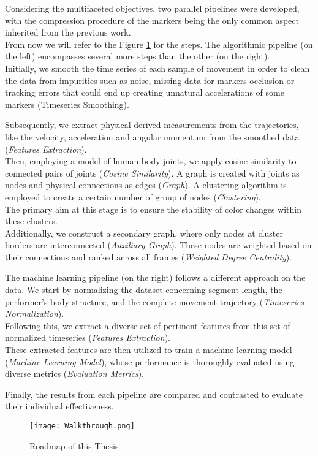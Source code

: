 Considering the multifaceted objectives, two parallel pipelines were developed, with the compression procedure of the markers being the only common aspect inherited from the previous work.
\\
From now we will refer to the Figure \ref{fig:walktrough} for the steps.
The algorithmic pipeline (on the left) encompasses several more steps than the other (on the right). 
\\
Initially, we smooth the time series of each sample of movement in order to clean the data from impurities such as noise, missing data for markers occlusion or tracking errors that could end up creating unnatural accelerations of some markers (Timeseries Smoothing).

Subsequently, we extract physical derived measurements from the trajectories, like the velocity, acceleration and angular momentum from the smoothed data (\textit{Features Extraction}). \\
Then, employing a model of human body joints, we apply cosine similarity to connected pairs of joints (\textit{Cosine Similarity}).
A graph is created with joints as nodes and physical connections as edges (\textit{Graph}). 
A clustering algorithm is employed to create a certain number of group of nodes (\textit{Clustering}). \\
The primary aim at this stage is to ensure the stability of color changes within these clusters. \\
Additionally, we construct a secondary graph, where only nodes at cluster borders are interconnected (\textit{Auxiliary Graph}).
These nodes are weighted based on their connections and ranked across all frames (\textit{Weighted Degree Centrality}).

The machine learning pipeline (on the right) follows a different approach on the data. 
We start by normalizing the dataset concerning segment length, the performer's body structure, and the complete movement trajectory (\textit{Timeseries Normalization}).\\
Following this, we extract a diverse set of pertinent features from this set of normalized timeseries (\textit{Features Extraction}).\\
These extracted features are then utilized to train a machine learning model (\textit{Machine Learning Model}), whose performance is thoroughly evaluated using diverse metrics (\textit{Evaluation Metrics}).

Finally, the results from each pipeline are compared and contrasted to evaluate their individual effectiveness.

\clearpage
\begin{figure}[H]
    \centering
    \vspace*{\fill}
    \texttt{[image: Walkthrough.png]}
    \caption{Roadmap of this Thesis}
    \label{fig:walktrough}
    \vspace*{\fill}
\end{figure}